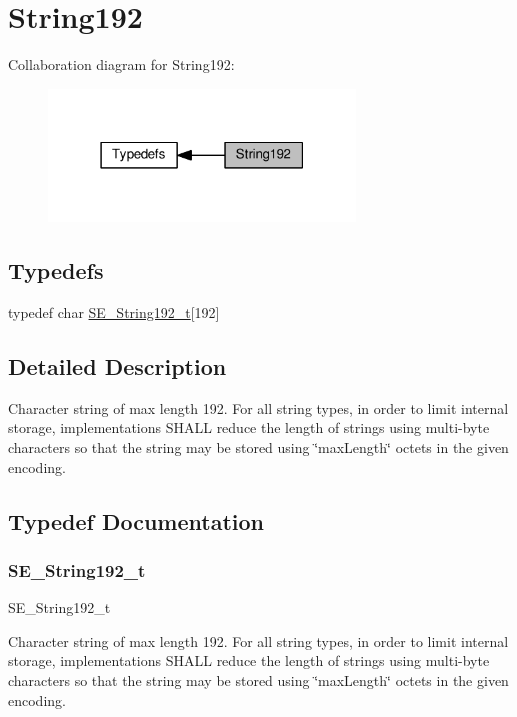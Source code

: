 \hypertarget{group__String192}{}\section{String192}
\label{group__String192}
Collaboration diagram for String192\+:\nopagebreak
\begin{figure}[H]
\begin{center}
\leavevmode
\includegraphics[width=231pt]{group__String192}
\end{center}
\end{figure}
\subsection*{Typedefs}
\begin{DoxyCompactItemize}
\item 
typedef char \hyperlink{group__String192_ga25f61da2bbbdfe30dbf77fcbb7edd7d7}{S\+E\+\_\+\+String192\+\_\+t}\mbox{[}192\mbox{]}
\end{DoxyCompactItemize}


\subsection{Detailed Description}
Character string of max length 192. For all string types, in order to limit internal storage, implementations S\+H\+A\+LL reduce the length of strings using multi-\/byte characters so that the string may be stored using \char`\"{}max\+Length\char`\"{} octets in the given encoding. 

\subsection{Typedef Documentation}
\mbox{\label{group__String192_ga25f61da2bbbdfe30dbf77fcbb7edd7d7}} 
\subsubsection{\texorpdfstring{S\+E\+\_\+\+String192\+\_\+t}{SE\_String192\_t}}
{\footnotesize\ttfamily S\+E\+\_\+\+String192\+\_\+t}

Character string of max length 192. For all string types, in order to limit internal storage, implementations S\+H\+A\+LL reduce the length of strings using multi-\/byte characters so that the string may be stored using \char`\"{}max\+Length\char`\"{} octets in the given encoding. 